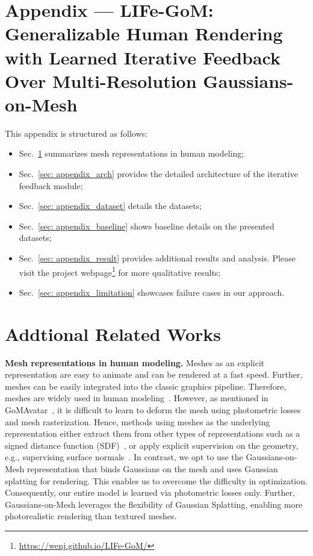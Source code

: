 \section*{Appendix --- LIFe-GoM: Generalizable Human Rendering with Learned Iterative Feedback Over Multi-Resolution Gaussians-on-Mesh}

This appendix is structured as follows:
\begin{itemize}
    \item Sec.~\ref{sec: appendix_related} summarizes mesh representations in human modeling;
    \item Sec.~\ref{sec: appendix_arch} provides the detailed architecture of the iterative feedback module;
    \item Sec.~\ref{sec: appendix_dataset} details the datasets;
    \item Sec.~\ref{sec: appendix_baseline} shows baseline details on the presented datasets;
    \item Sec.~\ref{sec: appendix_result} provides additional results and analysis. Please visit the project webpage\footnote{\url{https://wenj.github.io/LIFe-GoM/}} for more qualitative results;
    \item Sec.~\ref{sec: appendix_limitation} showcases failure cases in our approach.
\end{itemize}

\section{Addtional Related Works}
\label{sec: appendix_related}
\textbf{Mesh representations in human modeling.} Meshes as an explicit representation are easy to animate and can be rendered at a fast speed. Further, meshes can be easily integrated into the classic graphics pipeline. Therefore, meshes are widely used in human modeling~\citep{liao2024tada,zhang2023getavatar,liao2023high}. However, as mentioned in GoMAvatar~\citep{wen2024gomavatar}, it is difficult to learn to deform the mesh using photometric losses and mesh rasterization. Hence, methods using meshes as the underlying representation either extract them from other types of representations such as a signed distance function (SDF)~\citep{zhang2023getavatar,liao2023high}, or apply explicit supervision on the geometry, e.g., supervising surface normals~\citep{liao2024tada,zhang2023getavatar,liao2023high}. In contrast, we opt to use the Gaussians-on-Mesh representation that binds Gaussians on the mesh and uses Gaussian splatting for rendering. This enables us to overcome the difficulty in optimization. Consequently, our entire model is learned via photometric losses only. Further, Gaussians-on-Mesh leverages the flexibility of Gaussian Splatting, enabling more photorealistic rendering than textured meshes.


